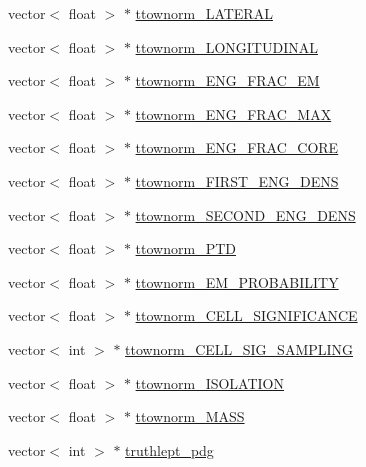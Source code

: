 \begin{DoxyCompactItemize}
vector$<$ float $>$ $\ast$ \hyperlink{classCollectionTree_a10628662b986b0b707d86e81152429bb}{ttownorm\+\_\+\+L\+A\+T\+E\+R\+AL}
\item 
vector$<$ float $>$ $\ast$ \hyperlink{classCollectionTree_ac256d7c784fc1f20ef25f41a82f183c2}{ttownorm\+\_\+\+L\+O\+N\+G\+I\+T\+U\+D\+I\+N\+AL}
\item 
vector$<$ float $>$ $\ast$ \hyperlink{classCollectionTree_a1276947a8b835b55e0eec772a1cf4d49}{ttownorm\+\_\+\+E\+N\+G\+\_\+\+F\+R\+A\+C\+\_\+\+EM}
\item 
vector$<$ float $>$ $\ast$ \hyperlink{classCollectionTree_a02a0e7fae7e536f940ab1d3dbccebf5d}{ttownorm\+\_\+\+E\+N\+G\+\_\+\+F\+R\+A\+C\+\_\+\+M\+AX}
\item 
vector$<$ float $>$ $\ast$ \hyperlink{classCollectionTree_aae059af1dc03af8eae3147657ff7a29e}{ttownorm\+\_\+\+E\+N\+G\+\_\+\+F\+R\+A\+C\+\_\+\+C\+O\+RE}
\item 
vector$<$ float $>$ $\ast$ \hyperlink{classCollectionTree_aa513fedc3a9e5f70f11c0309961c61b0}{ttownorm\+\_\+\+F\+I\+R\+S\+T\+\_\+\+E\+N\+G\+\_\+\+D\+E\+NS}
\item 
vector$<$ float $>$ $\ast$ \hyperlink{classCollectionTree_a765e33cc78b7f9bda46010bd5bac3a57}{ttownorm\+\_\+\+S\+E\+C\+O\+N\+D\+\_\+\+E\+N\+G\+\_\+\+D\+E\+NS}
\item 
vector$<$ float $>$ $\ast$ \hyperlink{classCollectionTree_a06fa9d74d233394e26a43a5915a5733f}{ttownorm\+\_\+\+P\+TD}
\item 
vector$<$ float $>$ $\ast$ \hyperlink{classCollectionTree_a9281ed42e133a2ebd5656533c64a61cf}{ttownorm\+\_\+\+E\+M\+\_\+\+P\+R\+O\+B\+A\+B\+I\+L\+I\+TY}
\item 
vector$<$ float $>$ $\ast$ \hyperlink{classCollectionTree_afd34b7827c619795c3a4281a667005d1}{ttownorm\+\_\+\+C\+E\+L\+L\+\_\+\+S\+I\+G\+N\+I\+F\+I\+C\+A\+N\+CE}
\item 
vector$<$ int $>$ $\ast$ \hyperlink{classCollectionTree_a8d04dfef6c56cabb1da8521d6a358161}{ttownorm\+\_\+\+C\+E\+L\+L\+\_\+\+S\+I\+G\+\_\+\+S\+A\+M\+P\+L\+I\+NG}
\item 
vector$<$ float $>$ $\ast$ \hyperlink{classCollectionTree_a8a43d4b2151339eec8872d505f3348e4}{ttownorm\+\_\+\+I\+S\+O\+L\+A\+T\+I\+ON}
\item 
vector$<$ float $>$ $\ast$ \hyperlink{classCollectionTree_a86fb63e9119efa16f5c2d174f64a3139}{ttownorm\+\_\+\+M\+A\+SS}
\item 
vector$<$ int $>$ $\ast$ \hyperlink{classCollectionTree_a1c48b314ca453954d7e8be4e841f362c}{truthlept\+\_\+pdg}
\item 

\end{DoxyCompactItemize}
